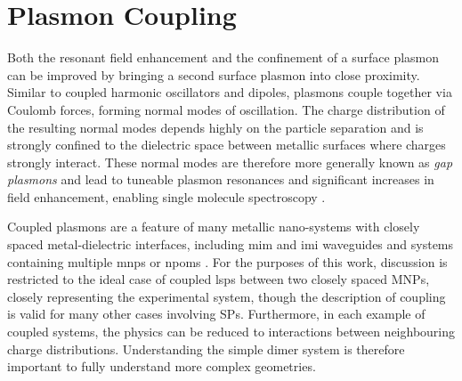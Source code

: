 \documentclass{article}
\begin{document}
\section{Plasmon Coupling}

Both the resonant field enhancement and the confinement of a surface plasmon can be improved by bringing a second surface plasmon into close proximity. Similar to coupled harmonic oscillators and dipoles, plasmons couple together via Coulomb forces, forming normal modes of oscillation. The charge distribution of the resulting normal modes depends highly on the particle separation and is strongly confined to the dielectric space between metallic surfaces where charges strongly interact. These normal modes are therefore more generally known as \emph{gap plasmons} and lead to tuneable plasmon resonances \cite{huang2010, millyard2012} and significant increases in field enhancement, enabling single molecule spectroscopy \cite{mertens2013, taylor2014}.

Coupled plasmons are a feature of many metallic nano-systems with closely spaced metal-dielectric interfaces, including \gls{mim} and \gls{imi} waveguides \cite{maier2007plasmonics, lindquist2013} and systems containing multiple \glspl{mnp} \cite{maier2002, atay2004, muskens2007, huang2010, millyard2012, taylor2011, herrmann2013} or \glspl{npom} \cite{okamoto2003, daniels2005, kinnan2007, mubeen2012, mertens2013, denijs2014}. For the purposes of this work, discussion is restricted to the ideal case of coupled \glspl{lsp} between two closely spaced MNPs, closely representing the experimental system, though the description of coupling is valid for many other cases involving SPs. Furthermore, in each example of coupled systems, the physics can be reduced to interactions between neighbouring charge distributions. Understanding the simple dimer system is therefore important to fully understand more complex geometries.
\end{document}

